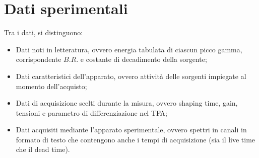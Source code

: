 \documentclass{article}
\begin{document}
    \newpage
    \section*{Dati sperimentali}
        Tra i dati, si distinguono:
        \begin{itemize}
            \item Dati noti in letteratura, ovvero energia tabulata di ciascun picco gamma, corrispondente $B.R.$ e costante di decadimento della sorgente;
            \item Dati caratteristici dell'apparato, ovvero attività delle sorgenti impiegate al momento dell'acquisto;
            \item Dati di acquisizione scelti durante la misura, ovvero shaping time, gain, tensioni e parametro di differenziazione nel TFA;
            \item Dati acquisiti mediante l'apparato sperimentale, ovvero spettri in canali in formato di testo che contengono anche i tempi di acquisizione (sia il live time che il dead time).
        \end{itemize}
\end{document}

